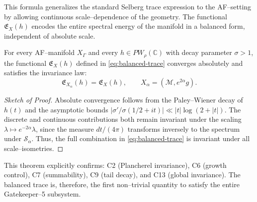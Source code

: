\begin{remark}
This formula generalizes the standard Selberg trace expression
to the AF–setting by allowing continuous scale–dependence of the geometry.
The functional \(\mathfrak{E}_X(h)\) encodes the entire spectral energy
of the manifold in a balanced form, independent of absolute scale.
\end{remark}


\begin{theorem}
\label{thm:balanced-convergence}
For every AF–manifold \(X_\Gamma\) and every \(h\in PW_\rho(\mathbb{C})\)
with decay parameter \(\sigma>1\),
the functional \(\mathfrak{E}_X(h)\) defined in \eqref{eq:balanced-trace}
converges absolutely and satisfies the invariance law:
\begin{equation}
\label{eq:self-similar-trace}
\mathfrak{E}_{X_\alpha}(h)
=
\mathfrak{E}_{X}(h),
\qquad
X_\alpha = (\mathcal{M}, e^{2\alpha} g).
\end{equation}
\end{theorem}

\begin{proof}[Sketch of Proof]
Absolute convergence follows from the Paley–Wiener decay of \(h(t)\)
and the asymptotic bounds
\(|\sigma'/\sigma(1/2+it)| \ll |t|\log(2+|t|)\).
The discrete and continuous contributions
both remain invariant under the scaling
\(\lambda \mapsto e^{-2\alpha}\lambda\),
since the measure \(dt/(4\pi)\)
transforms inversely to the spectrum under \(\mathcal{S}_\alpha\).
Thus, the full combination in \eqref{eq:balanced-trace}
is invariant under all scale–isometries.
\end{proof}

\begin{remark}
This theorem explicitly confirms:
C2 (Plancherel invariance),
C6 (growth control),
C7 (summability),
C9 (tail decay),
and C13 (global invariance).
The balanced trace is, therefore, the first non–trivial quantity
to satisfy the entire Gatekeeper–5 subsystem.
\end{remark}



